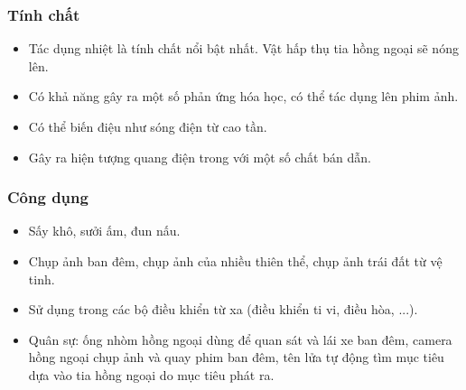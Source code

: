 \subsubsection{Tính chất}

\begin{itemize}
	\item  Tác dụng nhiệt là tính chất nổi bật nhất. Vật hấp thụ tia hồng ngoại sẽ nóng lên.
	\item  Có khả năng gây ra một số phản ứng hóa học, có thể tác dụng lên phim ảnh.
	\item  Có thể biến điệu như sóng điện từ cao tần.
	\item  Gây ra hiện tượng quang điện trong với một số chất bán dẫn.
\end{itemize}

\subsubsection{Công dụng}

\begin{itemize}
	\item Sấy khô, sưởi ấm, đun nấu.
	\item Chụp ảnh ban đêm, chụp ảnh của nhiều thiên thể, chụp ảnh trái đất từ vệ tinh.
	\item Sử dụng trong các bộ điều khiển từ xa (điều khiển ti vi, điều hòa, ...).
	\item Quân sự: ống nhòm hồng ngoại dùng để quan sát và lái xe ban đêm, camera hồng ngoại chụp ảnh và quay phim ban đêm, tên lửa tự động tìm mục tiêu dựa vào tia hồng ngoại do mục tiêu phát ra.
\end{itemize}

